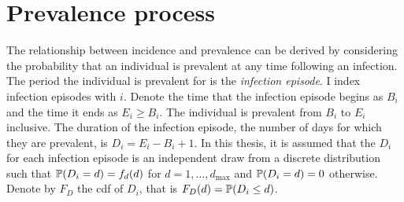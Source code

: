 \documentclass[thesis.tex]{subfiles}
\begin{document}





\section{Prevalence process}

The relationship between incidence and prevalence can be derived by considering the probability that an individual is prevalent at any time following an infection.
The period the individual is prevalent for is the \emph{infection episode}.
I index infection episodes with $i$.
Denote the time that the infection episode begins as $B_i$ and the time it ends as $E_i \geq B_i$.
The individual is prevalent from $B_i$ to $E_i$ inclusive.
The duration of the infection episode, the number of days for which they are prevalent, is $D_i = E_i - B_i + 1$.
In this thesis, it is assumed that the $D_i$ for each infection episode is an independent draw from a discrete distribution such that $\operatorname{\mathbb{P}}(D_i = d) = f_d(d)$ for $d = 1, \dots, d_\text{max}$ and $\operatorname{\mathbb{P}}(D_i = d) = 0$ otherwise.
Denote by $F_D$ the cdf of $D_i$, that is $F_D(d) = \operatorname{\mathbb{P}}(D_i \leq d)$.
\end{document}
